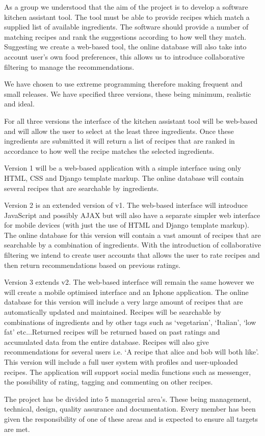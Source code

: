 As a group we understood that the aim of the project is to develop a software kitchen assistant tool. The tool must be able to provide recipes which match a supplied list of available ingredients. The software should provide a number of matching recipes and rank the suggestions according to how well they match. Suggesting we create a web-based tool, the online database will also take into account user’s own food preferences, this allows us to introduce collaborative filtering to manage the recommendations. 

We have chosen to use extreme programming therefore making frequent and small releases. We have specified three versions, these being minimum, realistic and ideal. 

For all three versions the interface of the kitchen assistant tool will be web-based and will allow the user to select at the least three ingredients. Once these ingredients are submitted it will return a list of recipes that are ranked in accordance to how well the recipe matches the selected ingredients. 

Version 1 will be a web-based application with a simple interface using only HTML, CSS and Django template markup. The online database will contain several recipes that are searchable by ingredients.

Version 2 is an extended version of v1.  The web-based interface will introduce JavaScript and possibly AJAX but will also have a separate simpler web interface for mobile devices (with just the use of HTML and Django template markup). The online database for this version will contain a vast amount of recipes that are searchable by a combination of ingredients. With the introduction of collaborative filtering we intend to create user accounts that allows the user to rate recipes and then return recommendations based on previous ratings. 

Version 3 extends v2. The web-based interface will remain the same however we will create a mobile optimised interface and an Iphone application. The online database for this version will include a very large amount of recipes that are automatically updated and maintained. Recipes will be searchable by combinations of ingredients and by other tags such as ‘vegetarian’, ‘Italian’, ‘low fat’ etc...Returned recipes will be returned based on past ratings and accumulated data from the entire database. Recipes will also give recommendations for several users i.e. ‘A recipe that alice and bob will both like’. This version will include a full user system with profiles and user-uploaded recipes. The application will support social media functions such as messenger, the possibility of rating, tagging and commenting on other recipes. 

The project has be divided into 5 managerial area’s. These being management, technical, design, quality assurance and documentation. Every member has been given the responsibility of one of these areas and is expected to ensure all targets are met.



